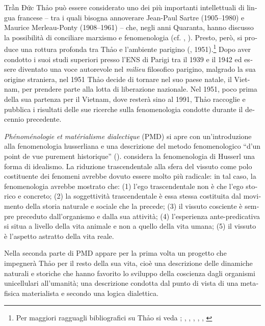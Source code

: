 \documentclass[output=paper]{../langscibook}
\begin{document}
\begin{otherlanguage}{italian}
Trần Đức Thảo può essere considerato uno dei più importanti intellettuali di lingua francese – tra i quali bisogna annoverare Jean-Paul Sartre (1905--1980) e Maurice Merleau-Ponty (1908--1961) – che, negli anni Quaranta, hanno discusso la possibilità di conciliare marxismo e fenomenologia (cf. \citealt{thao_marxisme_1946}, \citeyear{thao_existentialisme_1949}). Presto, però, si produce una rottura profonda tra Thảo e l’ambiente parigino (\citealt{thao_les_1950}, \citeyear{thao_phenomenologie_1951} 1951).\footnote{ \textrm{Per maggiori ragguagli bibliografici su Thảo si veda \citealt[1--11]{thao_formation_1991}; \citealt{thao_note_1993}, \citealt{giao_ecrits_1988}, \citealt{hemery_itineraire_2013}, \citealt{thao_les_2004}, \citeyear{thao_quelques_2013}, \citealt{feron_qui_2014}}} Dopo aver condotto i suoi studi superiori presso l’ENS di Parigi tra il 1939 e il 1942 ed essere diventato una voce autorevole nel \textit{milieu} filosofico parigino, malgrado la sua origine straniera, nel 1951 Thảo decide di tornare nel suo paese natale, il Vietnam, per prendere parte alla lotta di liberazione nazionale. Nel 1951, poco prima della sua partenza per il Vietnam, dove resterà sino al 1991, Thảo raccoglie e pubblica i risultati delle sue ricerche sulla fenomenologia condotte durante il decennio precedente. 

\textit{Phénoménologie} \textit{et} \textit{matérialisme} \textit{dialectique} (PMD) si apre con un’introduzione alla fenomenologia husserliana e una descrizione del metodo fenomenologico “d’un point de vue purement historique” (\citealt[5]{thao_phenomenologie_1951}). \citet[7]{thao_phenomenologie_1951} considera la fenomenologia di Husserl una forma di idealismo. La riduzione trascendentale alla sfera del vissuto come polo costituente dei fenomeni avrebbe dovuto essere molto più radicale: in tal caso, la fenomenologia avrebbe mostrato che: (1) l’ego trascendentale non è che l’ego storico e concreto; (2) la soggettività trascendentale è essa stessa costituita dal movimento della storia naturale e sociale che la precede; (3) il vissuto cosciente è sempre preceduto dall’organismo e dalla sua attività; (4) l’esperienza ante-predicativa si situa a livello della vita animale e non a quello della vita umana; (5) il vissuto è l’aspetto astratto della vita reale.

Nella seconda parte di PMD appare per la prima volta un progetto che impegnerà Th\textlatin{ả}o per il resto della sua vita, cioè una descrizione delle dinamiche naturali e storiche che hanno favorito lo sviluppo della coscienza dagli organismi unicellulari all’umanità; una descrizione condotta dal punto di vista di una metafisica materialista e secondo una logica dialettica.


\end{otherlanguage}
\end{document}
